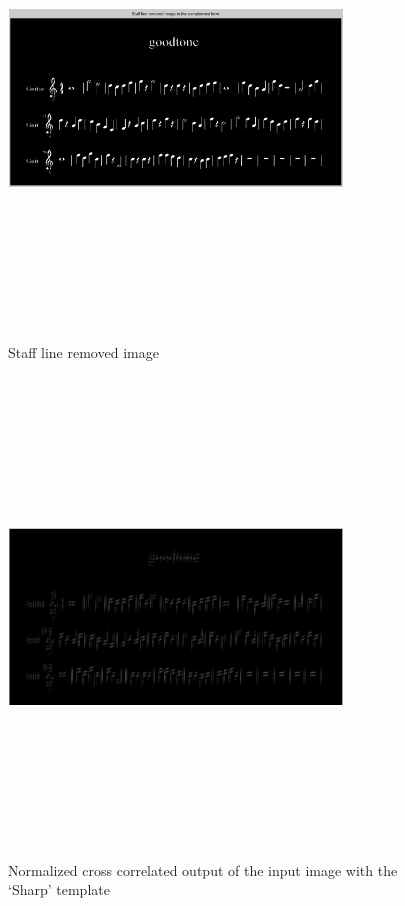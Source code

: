 \documentclass[journal]{IEEEtran}
\begin{document}
\begin{figure}
\includegraphics[width=3.5in,height=5.0in,clip,keepaspectratio]{resources/results/good_tone_staff_removed}
\centering
\caption{Staff line removed image}
\end{figure}

\begin{figure}
\includegraphics[width=3.5in,height=5.0in,clip,keepaspectratio]{resources/results/normalized_cross_correlation}
\centering
\caption{Normalized cross correlated output of the input image with the ‘Sharp’ template}
\end{figure}
\end{document}
